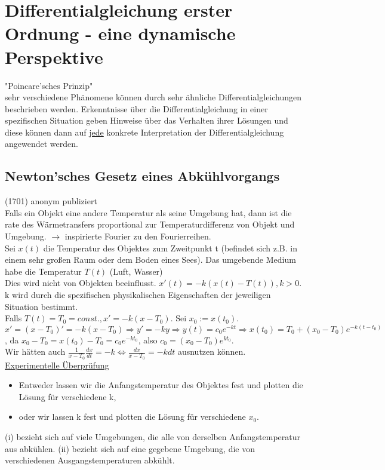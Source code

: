 \documentclass[12pt,a4paper]{article}
\newcommand{\DGL}{Differentialgleichung }
\newcommand{\DGLs}{Differentialgleichungen }
\begin{document}
\section{\DGL erster Ordnung - eine dynamische Perspektive}
"Poincare'sches Prinzip" \\
sehr verschiedene Phänomene können durch sehr ähnliche \DGLs beschrieben werden. Erkenntnisse über die \DGL in einer spezifischen Situation geben Hinweise über das Verhalten ihrer Lösungen und diese können dann auf \underline{jede} konkrete Interpretation der \DGL angewendet werden.
\subsection{Newton'sches Gesetz eines Abkühlvorgangs}
(1701) anonym publiziert \\
Falls ein Objekt eine andere Temperatur als seine Umgebung hat, dann ist die rate des Wärmetransfers proportional zur Temperaturdifferenz von Objekt und Umgebung. $\rightarrow$ inspirierte Fourier zu den Fourierreihen. \\
Sei $x(t)$ die Temperatur des Objektes zum Zweitpunkt t (befindet sich z.B. in einem sehr großen Raum oder dem Boden eines Sees). Das umgebende Medium habe die Temperatur $T(t)$ (Luft, Wasser) \\
Dies wird nicht von Objekten beeinflusst. $x'(t) = -k (x(t) - T(t)), k > 0$. k wird durch die spezifischen physikalischen Eigenschaften der jeweiligen Situation bestimmt. \\
Falls $T(t) = T_0 = const., x'=-k(x-T_0)$. Sei $x_0 := x(t_0)$. $x'=(x-T_0)' = -k(x-T_0) \Rightarrow y'=-ky \Rightarrow y(t) = c_0e^{-kt} \Rightarrow x(t_0) = T_0 + (x_0 - T_0)e^{-k(t-t_0)}$, da $x_0-T_0 = x(t_0) - T_0 = c_0e^{-kt_0}$, also $c_0 = (x_0-T_0)e^{kt_0}$. \\
Wir hätten auch $\frac{1}{x-T_0} \frac{dx}{dt} = -k \Leftrightarrow \frac{dx}{x-T_0} = -kdt$ ausnutzen können. \\
\underline{Experimentelle Überprüfung}
\begin{itemize}
\item[(i)] Entweder lassen wir die Anfangstemperatur des Objektes fest und plotten die Lösung für verschiedene k,
\item[(ii)] oder wir lassen k fest und plotten die Lösung für verschiedene $x_0$.
\end{itemize}
(i) bezieht sich auf viele Umgebungen, die alle von derselben Anfangstemperatur aus abkühlen. (ii) bezieht sich auf eine gegebene Umgebung, die von verschiedenen Ausgangstemperaturen abkühlt. \\
\end{document}
